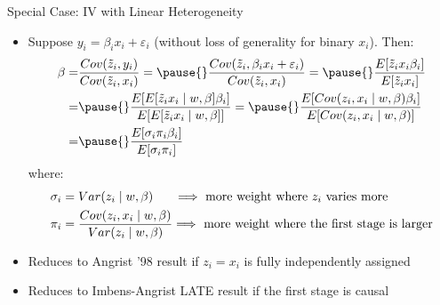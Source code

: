 \documentclass[11pt,english]{beamer}
\begin{document}
\begin{frame}{Special Case: IV with Linear Heterogeneity}
\begin{itemize}
\item Suppose $y_i=\beta_i x_i+\varepsilon_i$ (without loss of generality for binary $x_i$). Then:
\begin{align*}
\beta =& \frac{Cov(\tilde{z}_i,y_i)}{Cov(\tilde{z}_i,x_i)} = \pause{} \frac{Cov(\tilde{z}_i,\beta_i x_i+\varepsilon_i)}{Cov(\tilde{z}_i,x_i)}=\pause{}\frac{E[\tilde{z}_ix_i\beta_i]}{E[\tilde{z}_ix_i]}\\
=&\pause{} \frac{E[E[\tilde{z}_ix_i\mid w,\beta]\beta_i]}{E[E[\tilde{z}_ix_i\mid w,\beta]]}=\pause{}  \frac{E[Cov(z_i,x_i\mid w,\beta)\beta_i]}{E[Cov(z_i,x_i\mid w,\beta)]}\\
=&\pause{}  \frac{E[\sigma_i\pi_i\beta_i]}{E[\sigma_i\pi_i]}
\end{align*}
where:
\begin{align*}
\sigma_i &= Var(z_i\mid w,\beta)\hspace{0.6cm}\text{$\implies$ more weight where $z_i$ varies more}\\
\pi_i &= \frac{Cov(z_i,x_i\mid w,\beta)}{Var(z_i\mid w,\beta)}\text{$\implies$ more weight where the first stage is larger}
\end{align*}\pause{}
\item Reduces to Angrist '98 result if $z_i=x_i$ is fully independently assigned \pause{}\smallskip
\item Reduces to Imbens-Angrist LATE result if the first stage is causal
\end{itemize}

\end{frame}
\end{document}
